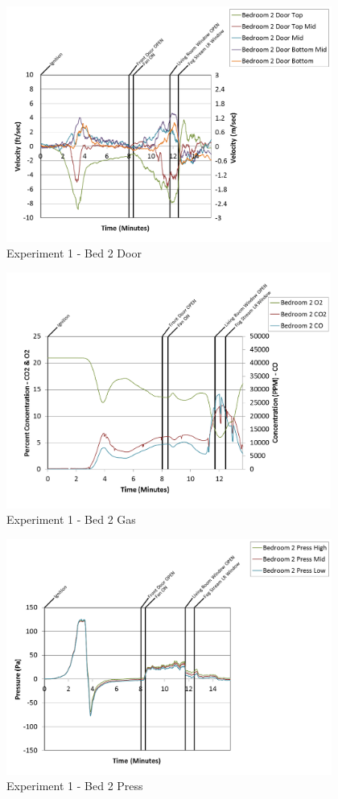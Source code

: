\documentclass{article}
\begin{document}
\begin{appendices}
\begin{figure}[h!]
	\centering
	\includegraphics[height=3.05in]{0_Images/Results_Charts/Exp_1_Charts/Bed2Door.png}
	\caption{Experiment 1 - Bed 2 Door}
\end{figure}

\clearpage

\begin{figure}[h!]
	\centering
	\includegraphics[height=3.05in]{0_Images/Results_Charts/Exp_1_Charts/Bed2Gas.png}
	\caption{Experiment 1 - Bed 2 Gas}
\end{figure}


\begin{figure}[h!]
	\centering
	\includegraphics[height=3.05in]{0_Images/Results_Charts/Exp_1_Charts/Bed2Press.png}
	\caption{Experiment 1 - Bed 2 Press}
\end{figure}


\end{appendices}
\end{document}
